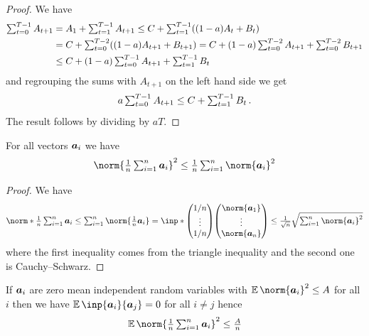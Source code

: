 \documentclass{article}
\begin{document}
\begin{proof}
  We have
  \begin{align*}
    \tsum_{t=0}^{T-1} A_{t+1}
     &=
    A_1 + \tsum_{t=1}^{T-1} A_{t+1}
     \le 
    C + \tsum_{t=1}^{T-1} ((1-a) A_t + B_t)
    \\     
     &=
    C + \tsum_{t=0}^{T-2} ((1-a) A_{t+1} + B_{t+1})
     =
    C + (1-a) \tsum_{t=0}^{T-2} A_{t+1}  + \tsum_{t=0}^{T-2} B_{t+1}
    \\
     & \le 
        C + (1-a) \tsum_{t=0}^{T-1} A_{t+1}  + \tsum_{t=1}^{T-1} B_t
  \end{align*}
  and regrouping the sums with $A_{t+1}$ on the left hand side we get 
  \[
    a \tsum_{t=0}^{T-1} A_{t+1}
     \le 
     C  + \tsum_{t=1}^{T-1} B_t \, .
  \]
  The result follows by dividing by $a T$.
\end{proof}


\begin{lemma}\label{lem:mean-norm-bound}
For all vectors $\aa_i$ we have 
\[
  \norm{\tfrac{1}{n} \tsum_{i=1}^n \aa_i}^2
   \le
  \tfrac{1}{n} \tsum_{i=1}^n \norm{\aa_i}^2
\]
\end{lemma}

\begin{proof}
We have   
  \begin{align*}
    \norm*{ \tfrac{1}{n} \tsum_{i=1}^n \aa_i }
    \leq
    \tsum_{i=1}^n \norm{\tfrac{1}{n} \aa_i}
    =
    \inp*{
      \begin{pmatrix} 1/n \\ \vdots \\ 1/n \end{pmatrix}
    }{
      \begin{pmatrix} \norm{\aa_1} \\ \vdots \\ \norm{\aa_n} \end{pmatrix}
    }
    \leq
    \tfrac{1}{\sqrt n} \sqrt{\tsum_{i=1}^n \norm{\aa_i}^2}
  \end{align*}
  where the first inequality comes from the triangle inequality and the second one is Cauchy--Schwarz.
\end{proof}


\begin{lemma}\label{lem:mean-norm-bound-indep}
If $\aa_i$ are zero mean independent random variables with $\E \norm{\aa_i}^2 \leq A$ for all $i$ then we have $\E \inp{\aa_i}{\aa_j} = 0$ for all $i \neq j$ hence
\[
  \E \norm{\tfrac{1}{n} \tsum_{i=1}^n \aa_i}^2
   \le
  \tfrac{A}{n}
\]
\end{lemma}
\end{document}
